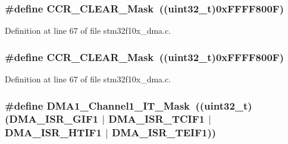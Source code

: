 \subsubsection[{\texorpdfstring{C\+C\+R\+\_\+\+C\+L\+E\+A\+R\+\_\+\+Mask}{CCR_CLEAR_Mask}}]{\setlength{\rightskip}{0pt plus 5cm}\#define C\+C\+R\+\_\+\+C\+L\+E\+A\+R\+\_\+\+Mask~(({\bf uint32\+\_\+t})0x\+F\+F\+F\+F800\+F)}\hypertarget{group___d_m_a___private___defines_gac2c71cc75907c7c3467907e766dc4188}{}\label{group___d_m_a___private___defines_gac2c71cc75907c7c3467907e766dc4188}


Definition at line 67 of file stm32f10x\+\_\+dma.\+c.

\subsubsection[{\texorpdfstring{C\+C\+R\+\_\+\+C\+L\+E\+A\+R\+\_\+\+Mask}{CCR_CLEAR_Mask}}]{\setlength{\rightskip}{0pt plus 5cm}\#define C\+C\+R\+\_\+\+C\+L\+E\+A\+R\+\_\+\+Mask~(({\bf uint32\+\_\+t})0x\+F\+F\+F\+F800\+F)}\hypertarget{group___d_m_a___private___defines_gac2c71cc75907c7c3467907e766dc4188}{}\label{group___d_m_a___private___defines_gac2c71cc75907c7c3467907e766dc4188}


Definition at line 67 of file stm32f10x\+\_\+dma.\+c.

\subsubsection[{\texorpdfstring{D\+M\+A1\+\_\+\+Channel1\+\_\+\+I\+T\+\_\+\+Mask}{DMA1_Channel1_IT_Mask}}]{\setlength{\rightskip}{0pt plus 5cm}\#define D\+M\+A1\+\_\+\+Channel1\+\_\+\+I\+T\+\_\+\+Mask~(({\bf uint32\+\_\+t})({\bf D\+M\+A\+\_\+\+I\+S\+R\+\_\+\+G\+I\+F1} $\vert$ {\bf D\+M\+A\+\_\+\+I\+S\+R\+\_\+\+T\+C\+I\+F1} $\vert$ {\bf D\+M\+A\+\_\+\+I\+S\+R\+\_\+\+H\+T\+I\+F1} $\vert$ {\bf D\+M\+A\+\_\+\+I\+S\+R\+\_\+\+T\+E\+I\+F1}))}\hypertarget{group___d_m_a___private___defines_ga76177263f2b9878765606f3bb8b9cc64}{}\label{group___d_m_a___private___defines_ga76177263f2b9878765606f3bb8b9cc64}


